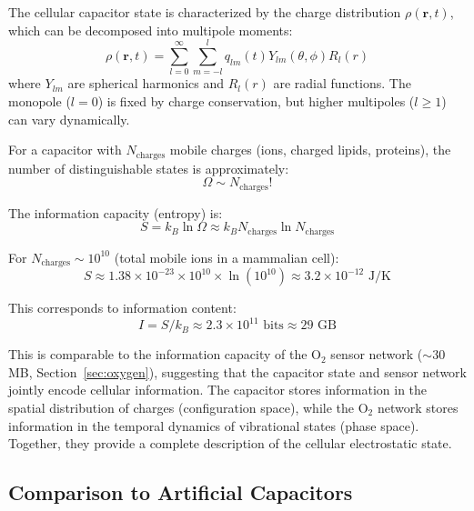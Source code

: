 \documentclass[twocolumn,10pt,aps,prd,superscriptaddress,floatfix,nofootinbib]{revtex4-2}
\theoremstyle{remark}
\begin{document}
The cellular capacitor state is characterized by the charge distribution $\rho(\mathbf{r}, t)$, which can be decomposed into multipole moments:
\begin{equation}
\rho(\mathbf{r}, t) = \sum_{l=0}^{\infty} \sum_{m=-l}^{l} q_{lm}(t) Y_{lm}(\theta, \phi) R_l(r)
\label{eq:multipole_expansion}
\end{equation}
where $Y_{lm}$ are spherical harmonics and $R_l(r)$ are radial functions. The monopole ($l=0$) is fixed by charge conservation, but higher multipoles ($l \geq 1$) can vary dynamically.

For a capacitor with $N_{\mathrm{charges}}$ mobile charges (ions, charged lipids, proteins), the number of distinguishable states is approximately:
\begin{equation}
\Omega \sim N_{\mathrm{charges}}!
\end{equation}

The information capacity (entropy) is:
\begin{equation}
S = k_B \ln \Omega \approx k_B N_{\mathrm{charges}} \ln N_{\mathrm{charges}}
\end{equation}

For $N_{\mathrm{charges}} \sim 10^{10}$ (total mobile ions in a mammalian cell):
\begin{equation}
S \approx 1.38 \times 10^{-23} \times 10^{10} \times \ln(10^{10}) \approx 3.2 \times 10^{-12} \text{ J/K}
\end{equation}

This corresponds to information content:
\begin{equation}
I = S/k_B \approx 2.3 \times 10^{11} \text{ bits} \approx 29 \text{ GB}
\end{equation}

This is comparable to the information capacity of the O$_2$ sensor network ($\sim 30$ MB, Section~\ref{sec:oxygen}), suggesting that the capacitor state and sensor network jointly encode cellular information. The capacitor stores information in the spatial distribution of charges (configuration space), while the O$_2$ network stores information in the temporal dynamics of vibrational states (phase space). Together, they provide a complete description of the cellular electrostatic state.

\subsection{Comparison to Artificial Capacitors}
\end{document}
